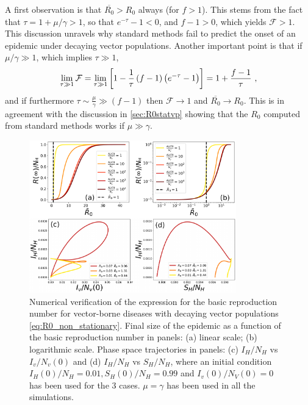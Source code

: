 A first observation is that $\overline{R_0}>R_0$ always (for $f>1$). This
stems from the fact that $\tau=1+\mu/\gamma>1$, so that $e^{-\tau}-1<0$, and
$f-1>0$, which yields $\mathcal{F}>1$. This discussion unravels why standard
methods fail to predict the onset of an epidemic under decaying vector
populations. Another important point is that if $\mu/\gamma\gg 1$, which
implies $\tau\gg1$,
\begin{equation}
    \lim_{\tau\gg1}\mathcal{F}=\lim_{\tau\gg1}\left[1-\frac{1}{\tau}
        \left(f-1\right)\left(e^{-\tau}-1\right)\right]=1+\frac{f-1}{\tau}\
    ,
\end{equation}
and if furthermore $\tau\sim\frac{\mu}{\gamma}\gg (f-1)$ then
$\mathcal{F}\to 1$ and $\overline{R_0}\to R_0$. This is in agreement with the
discussion in \cref{sec:R0statvp} showing that the $R_0$ computed from standard
methods works if $\mu\gg\gamma$.

\begin{figure}[H]
    \centering
    \includegraphics[width=0.8\textwidth]{Figures/R0_check_mean_value.pdf}
    \caption{Numerical verification of the expression for the basic
        reproduction number for vector-borne diseases with decaying vector
        populations
        \cref{eq:R0_non_stationary}. Final size of the epidemic as a function
        of the
        basic reproduction number in panels: (a) linear scale; (b) logarithmic
        scale.
        Phase space trajectories in panels: (c) $I_H/N_H$ vs $I_v/N_v(0)$ and
        (d)
        $I_H/N_H$ vs $S_H/N_H$, where an initial condition $I_H(0)/N_H=0.01,
            S_H(0)/N_H=0.99$ and $I_v(0)/N_V(0)=0$ has been used for the $3$
        cases.
        $\mu=\gamma$ has been used in all the simulations.}
    \label{fig:R0_check_mean_value}
\end{figure}

